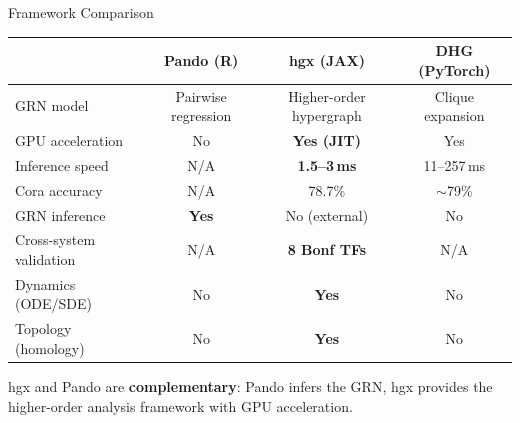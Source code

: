 \documentclass[aspectratio=169,11pt]{beamer}
\begin{document}

\begin{frame}{Framework Comparison}

\begin{table}
\centering
\small
\begin{tabular}{p{3.5cm}ccc}
\toprule
& \textbf{Pando (R)} & \textbf{hgx (JAX)} & \textbf{DHG (PyTorch)} \\
\midrule
GRN model & Pairwise regression & Higher-order hypergraph & Clique expansion \\
GPU acceleration & No & \textcolor{pollengreen}{\textbf{Yes (JIT)}} & Yes \\
Inference speed & N/A & \textcolor{pollengreen}{\textbf{1.5--3\,ms}} & 11--257\,ms \\
Cora accuracy & N/A & 78.7\% & $\sim$79\% \\
GRN inference & \textcolor{pollengreen}{\textbf{Yes}} & No (external) & No \\
Cross-system validation & N/A & \textcolor{pollengreen}{\textbf{8 Bonf TFs}} & N/A \\
Dynamics (ODE/SDE) & No & \textcolor{pollengreen}{\textbf{Yes}} & No \\
Topology (homology) & No & \textcolor{pollengreen}{\textbf{Yes}} & No \\
\bottomrule
\end{tabular}
\end{table}

\vspace{0.5em}
\centering
hgx and Pando are \textbf{complementary}: Pando infers the GRN, hgx provides the higher-order analysis framework with GPU acceleration.

\end{frame}

\end{document}
